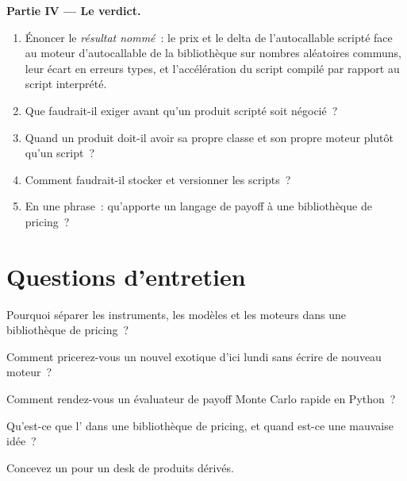 \begin{problem}
\medskip\noindent\textbf{Partie IV --- Le verdict.}
\begin{enumerate}[resume]
\item Énoncer le \emph{résultat nommé}~: le prix et le delta de l'autocallable scripté face au moteur d'autocallable de la bibliothèque sur
nombres aléatoires communs, leur écart en erreurs types, et l'accélération du script compilé par rapport au script interprété.
\item Que faudrait-il exiger avant qu'un produit scripté soit négocié~?
\item Quand un produit doit-il avoir sa propre classe et son propre moteur plutôt qu'un script~?
\item Comment faudrait-il stocker et versionner les scripts~?
\item En une phrase~: qu'apporte un langage de payoff à une bibliothèque de pricing~?
\end{enumerate}
\end{problem}

\section{Questions d'entretien}

\begin{interviewq}\label{iq:pl:pricing-library-architecture:1}
Pourquoi séparer les instruments, les modèles et les moteurs dans une bibliothèque de pricing~?
\end{interviewq}

\begin{interviewq}\label{iq:pl:pricing-library-architecture:2}
Comment pricerez-vous un nouvel exotique d'ici lundi sans écrire de nouveau moteur~?
\end{interviewq}

\begin{interviewq}\label{iq:pl:pricing-library-architecture:3}
Comment rendez-vous un évaluateur de payoff Monte Carlo rapide en Python~?
\end{interviewq}

\begin{interviewq}\label{iq:pl:pricing-library-architecture:4}
Qu'est-ce que l' dans une bibliothèque de pricing, et quand est-ce une mauvaise idée~?
\end{interviewq}

\begin{interviewq}\label{iq:pl:pricing-library-architecture:5}
Concevez un  pour un desk de produits dérivés.
\end{interviewq}
